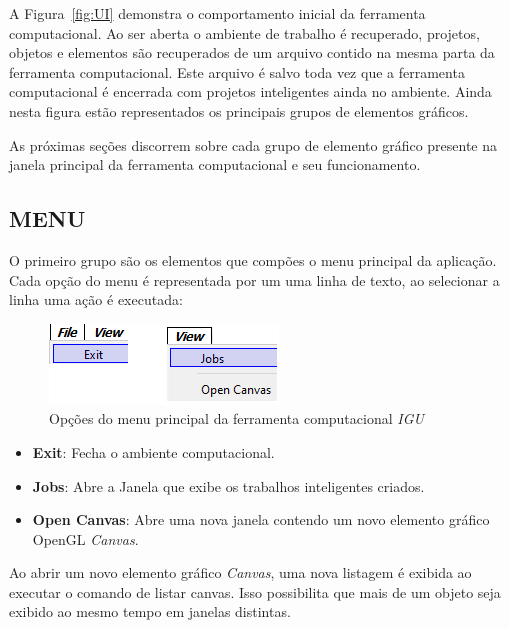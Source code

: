 \documentclass[a4paper,12pt]{monografia}
\theoremstyle{plain}
\theoremstyle{definition}
\theoremstyle{remark}
\begin{document}
A Figura~\ref{fig:UI} demonstra o comportamento inicial da ferramenta computacional. Ao ser aberta o ambiente de trabalho é recuperado, projetos, objetos e elementos são recuperados de um arquivo contido na mesma parta da ferramenta computacional. Este arquivo é salvo toda vez que a ferramenta computacional é encerrada com projetos inteligentes ainda no ambiente. Ainda nesta figura estão representados os principais grupos de elementos gráficos.

As próximas seções discorrem sobre cada grupo de elemento gráfico presente na janela principal da ferramenta computacional e seu funcionamento.

\subsection{MENU}\label{sec:menu}

O primeiro grupo são os elementos que compões o menu principal da aplicação. Cada opção do menu é representada por um uma linha de texto, ao selecionar a linha uma ação é executada:

\begin{figure}[!htbp]
	\centering
	\includegraphics[scale=1]{Figures/IGU_016.png}
	\caption{Opções do menu principal da ferramenta computacional \textit{IGU}}
	\label{fig:menu}
\end{figure}


\begin{itemize}
	\item \textbf{Exit}: Fecha o ambiente computacional.
	\item \textbf{Jobs}: Abre a Janela que exibe os trabalhos inteligentes criados.
	\item \textbf{Open Canvas}: Abre uma nova janela contendo um novo elemento gráfico OpenGL \textit{Canvas}.
\end{itemize}

Ao abrir um novo elemento gráfico \textit{Canvas}, uma nova listagem é exibida ao executar o comando de listar canvas. Isso possibilita que mais de um objeto seja exibido ao mesmo tempo em janelas distintas.

\end{document}
